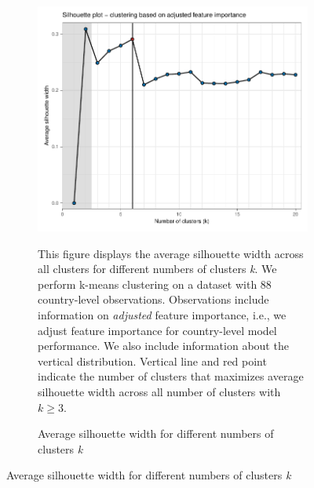 \begin{figure}[ht!]
\centering
  \caption{Silhouette analysis}\label{fig:Silhouette}
   \begin{subfigure}[b]{\textwidth}
   \centering
   \includegraphics{Figures_Appendix/Figure_Silhouette_2.pdf}
   \caption{Average silhouette width for different numbers of clusters \textit{k}} \label{fig:G3_silhouette_2}
   \begin{subcaption2}
     This figure displays the average silhouette width across all clusters for different numbers of clusters \textit{k}. We perform k-means clustering on a dataset with 88 country-level observations. Observations include information on \textit{adjusted} feature importance, i.e., we adjust feature importance for country-level model performance. We also include information about the vertical distribution. Vertical line and red point indicate the number of clusters that maximizes average silhouette width across all number of clusters with $k \geq 3$.
   \end{subcaption2}
   \end{subfigure}
 \end{figure}
 \clearpage

